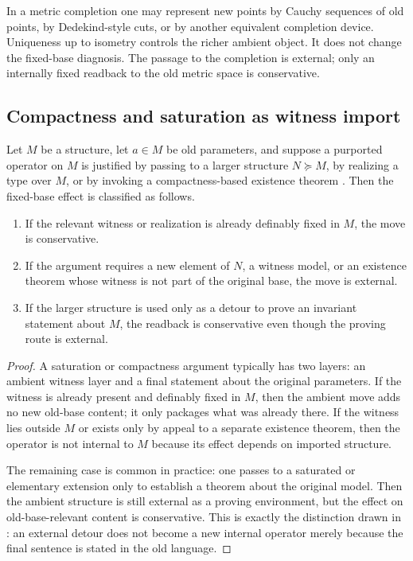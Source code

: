 \begin{example}
In a metric completion one may represent new points by Cauchy sequences of old points, by Dedekind-style cuts, or by another equivalent completion device. Uniqueness up to isometry controls the richer ambient object. It does not change the fixed-base diagnosis. The passage to the completion is external; only an internally fixed readback to the old metric space is conservative.
\end{example}

\subsection{Compactness and saturation as witness import}

\begin{proposition}\label{prop:app-model-witness}
Let $M$ be a structure, let $a\in M$ be old parameters, and suppose a purported operator on $M$ is justified by passing to a larger structure $N\succeq M$, by realizing a type over $M$, or by invoking a compactness-based existence theorem \citep{ChangKeisler1990,Hodges1993,Marker2002}. Then the fixed-base effect is classified as follows.
\begin{enumerate}[label=(\alph*)]
    \item If the relevant witness or realization is already definably fixed in $M$, the move is conservative.
    \item If the argument requires a new element of $N$, a witness model, or an existence theorem whose witness is not part of the original base, the move is external.
    \item If the larger structure is used only as a detour to prove an invariant statement about $M$, the readback is conservative even though the proving route is external.
\end{enumerate}
\end{proposition}

\begin{proof}
A saturation or compactness argument typically has two layers: an ambient witness layer and a final statement about the original parameters. If the witness is already present and definably fixed in $M$, then the ambient move adds no new old-base content; it only packages what was already there. If the witness lies outside $M$ or exists only by appeal to a separate existence theorem, then the operator is not internal to $M$ because its effect depends on imported structure.

The remaining case is common in practice: one passes to a saturated or elementary extension only to establish a theorem about the original model. Then the ambient structure is still external as a proving environment, but the effect on old-base-relevant content is conservative. This is exactly the distinction drawn in : an external detour does not become a new internal operator merely because the final sentence is stated in the old language.
\end{proof}

